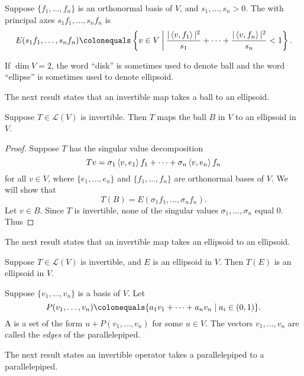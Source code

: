 \begin{definition}[Ellipsoid]
Suppose $\{f_1,\dots,f_n\}$ is an orthonormal basis of $V$, and $s_1,\dots,s_n>0$. The  with principal axes $s_1f_1,\dots,s_nf_n$ is
\[E(s_1f_1,\dots,s_nf_n)\colonequals\crbrac{v\in V\:\bigg|\:\frac{|\angbrac{v,f_1}|^2}{s_1}+\cdots+\frac{|\angbrac{v,f_n}|^2}{s_n}<1}.\]
\end{definition}

\begin{remark}
If $\dim V=2$, the word ``disk'' is sometimes used to denote ball and the word ``ellipse'' is sometimes used to denote ellipsoid.
\end{remark}

The next result states that an invertible map takes a ball to an ellipsoid.

\begin{proposition}
Suppose $T\in\mathcal{L}(V)$ is invertible. Then $T$ maps the ball $B$ in $V$ to an ellipsoid in $V$.
\end{proposition}

\begin{proof}
Suppose $T$ has the singular value decomposition
\[Tv=\sigma_1\left\langle v,e_1\right\rangle f_1+\cdots+\sigma_n\left\langle v,e_n\right\rangle f_n\]
for all $v\in V$, where $\{e_1,\dots,e_n\}$ and $\{f_1,\dots,f_n\}$ are orthonormal bases of $V$. 
We will show that
\[T(B)=E(\sigma_1f_1,\dots,\sigma_nf_n).\]
\fbox{$\subset$} Let $v\in B$. Since $T$ is invertible, none of the singular values $\sigma_1,\dots,\sigma_n$ equal $0$. Thus

\fbox{$\supset$} 
\end{proof}

The next result states that an invertible map takes an ellipsoid to an ellipsoid.

\begin{proposition}
Suppose $T\in\mathcal{L}(V)$ is invertible, and $E$ is an ellipsoid in $V$. Then $T(E)$ is an ellipsoid in $V$.
\end{proposition}

\begin{definition}[Parallelepiped]
Suppose $\{v_1,\dots,v_n\}$ is a basis of $V$. Let
\[P(v_1,\dots,v_n)\colonequals\{a_1v_1+\cdots+a_nv_n\mid a_i\in(0,1)\}.\]
A  is a set of the form $u+P(v_1,\dots,v_n)$ for some $u\in V$. 
The vectors $v_1,\dots,v_n$ are called the \emph{edges} of the parallelepiped.
\end{definition}

The next result states an invertible operator takes a parallelepiped to a parallelepiped.

